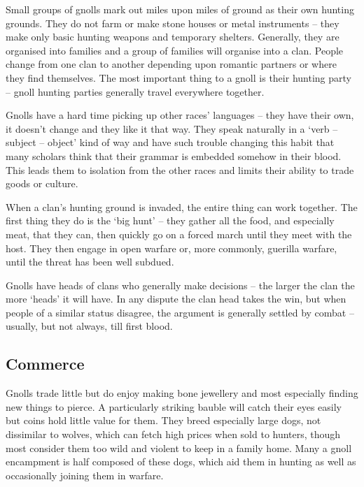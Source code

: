 \documentclass[titlepage,a4paper,openany]{book}
\begin{document}
\begin{multicols}{2}

Small groups of gnolls mark out miles upon miles of ground as their own hunting grounds. They do not farm or make stone houses or metal instruments -- they make only basic hunting weapons and temporary shelters. Generally, they are organised into families and a group of families will organise into a clan. People change from one clan to another depending upon romantic partners or where they find themselves. The most important thing to a gnoll is their hunting party -- gnoll hunting parties generally travel everywhere together.

Gnolls have a hard time picking up other races' languages -- they have their own, it doesn't change and they like it that way. They speak naturally in a `verb -- subject -- object' kind of way and have such trouble changing this habit that many scholars think that their grammar is embedded somehow in their blood. This leads them to isolation from the other races and limits their ability to trade goods or culture.

When a clan's hunting ground is invaded, the entire thing can work together. The first thing they do is the `big hunt' -- they gather all the food, and especially meat, that they can, then quickly go on a forced march until they meet with the host. They then engage in open warfare or, more commonly, guerilla warfare, until the threat has been well subdued.

Gnolls have heads of clans who generally make decisions -- the larger the clan the more `heads' it will have. In any dispute the clan head takes the win, but when people of a similar status disagree, the argument is generally settled by combat -- usually, but not always, till first blood.

\subsection{Commerce}

Gnolls trade little but do enjoy making bone jewellery and most especially finding new things to pierce. A particularly striking bauble will catch their eyes easily but coins hold little value for them. They breed especially large dogs, not dissimilar to wolves, which can fetch high prices when sold to hunters, though most consider them too wild and violent to keep in a family home. Many a gnoll encampment is half composed of these dogs, which aid them in hunting as well as occasionally joining them in warfare.


\end{multicols}
\end{document}
